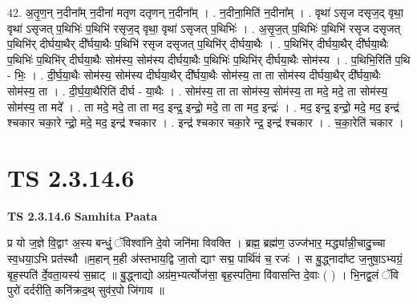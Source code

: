 \documentclass[17pt]{extarticle}
\begin{document}
42. अ॒तृ॒ण॒न् न॒दीना᳚म् न॒दीना॑ मतृण दतृणन् न॒दीना᳚म् । . न॒दीना॒मिति॑ न॒दीना᳚म् । . वृथा॑ ऽसृज दसृज॒द् वृथा॒ वृथा॑ ऽसृजत् प॒थिभिः॑ प॒थिभि॑ रसृज॒द् वृथा॒ वृथा॑ ऽसृजत् प॒थिभिः॑ । . अ॒सृ॒ज॒त् प॒थिभिः॑ प॒थिभि॑ रसृज दसृजत् प॒थिभि॑र् दीर्घया॒थैर् दी᳚र्घया॒थैः प॒थिभि॑ रसृज दसृजत् प॒थिभि॑र् दीर्घया॒थैः । . प॒थिभि॑र् दीर्घया॒थैर् दी᳚र्घया॒थैः प॒थिभिः॑ प॒थिभि॑र् दीर्घया॒थैः सोम॑स्य॒ सोम॑स्य दीर्घया॒थैः प॒थिभिः॑ प॒थिभि॑र् दीर्घया॒थैः सोम॑स्य । . प॒थिभि॒रिति॑ प॒थि - भिः॒ । . दी॒र्घ॒या॒थैः सोम॑स्य॒ सोम॑स्य दीर्घया॒थैर् दी᳚र्घया॒थैः सोम॑स्य॒ ता ता सोम॑स्य दीर्घया॒थैर् दी᳚र्घया॒थैः सोम॑स्य॒ ता । . दी॒र्घ॒या॒थैरिति॑ दीर्घ - या॒थैः । . सोम॑स्य॒ ता ता सोम॑स्य॒ सोम॑स्य॒ ता मदे॒ मदे॒ ता सोम॑स्य॒ सोम॑स्य॒ ता मदे᳚ । . ता मदे॒ मदे॒ ता ता मद॒ इन्द्र॒ इन्द्रो॒ मदे॒ ता ता मद॒ इन्द्रः॑ । . मद॒ इन्द्र॒ इन्द्रो॒ मदे॒ मद॒ इन्द्र॑ श्चकार चका॒रे न्द्रो॒ मदे॒ मद॒ इन्द्र॑ श्चकार । . इन्द्र॑ श्चकार चका॒रे न्द्र॒ इन्द्र॑ श्चकार । . च॒का॒रेति॑ चकार । \newline
\pagebreak
{}
\section*{ TS 2.3.14.6 }

\textbf{TS 2.3.14.6 } \newline
\textbf{Samhita Paata} \newline

प्र यो ज॒ज्ञे वि॒द्वाꣳ अ॒स्य बन्धुं॒ ॅविश्वा॑नि दे॒वो जनि॑मा विवक्ति । ब्रह्म॒ ब्रह्म॑ण॒ उज्ज॑भार॒ मद्ध्या᳚न्नी॒चादु॒च्चा स्व॒धया॒ऽभि प्रत॑स्थौ ॥म॒हान् म॒ही अ॑स्तभाय॒द्वि जा॒तो द्याꣳ सद्म॒ पार्थि॑वं च॒ रजः॑ । स बु॒द्ध्नादा᳚ष्ट ज॒नुषा॒ऽभ्यग्रं॒ बृह॒स्पति॑ र्दे॒वता॒यस्य॑ स॒म्राट् ॥ बु॒द्ध्नाद्यो अग्र॑म॒भ्यर्त्योज॑सा॒ बृह॒स्पति॒मा वि॑वासन्ति दे॒वाः ( ) । भि॒नद्व॒लं ॅवि पुरो॑ दर्दरीति॒ कनि॑क्रद॒थ् सुव॑र॒पो जि॑गाय ॥ \newline
\end{document}
